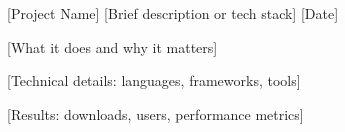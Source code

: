 \begin{cventries}
  \cventry
    {[Project Name]} %
    {[Brief description or tech stack]} %
    {} %
    {[Date]} %
    {
      \begin{cvitems}
        \item {[What it does and why it matters]}
        \item {[Technical details: languages, frameworks, tools]}
        \item {[Results: downloads, users, performance metrics]}
      \end{cvitems}
    }
\end{cventries}
